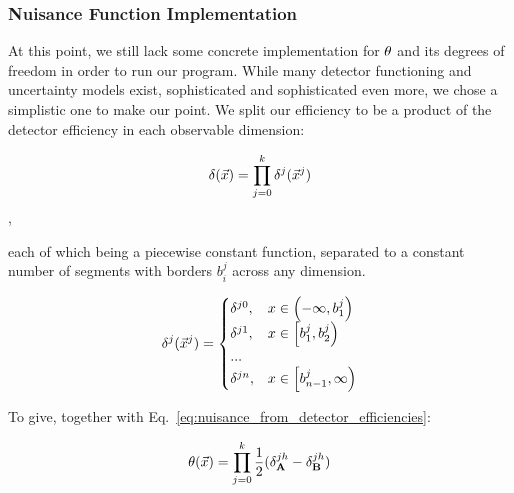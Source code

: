 \documentclass[../../ddppaper2.tex]{subfiles}
\begin{document}

\subsubsection{Nuisance Function Implementation}


At this point, we still lack some concrete implementation for ${\theta}$ and its degrees of freedom in order to run our program. While many detector functioning and uncertainty models exist, sophisticated and sophisticated even more, we chose a simplistic one to make our point. We split our efficiency to be a product of the detector efficiency in each observable dimension:

\begin{equation}
    \delta(\vec{{x}}) = \prod\limits_{j=0}^k \delta^j(\vec{{x}}^j)
\end{equation},

\noindent each of which being a piecewise constant function, separated to a constant number of segments with borders $b_i^j$ across any dimension.

\begin{equation}
    \delta^j(\vec{{x}}^j) = 
    \begin{cases}
        \delta^{j0}, &x \in \left(-\infty, b_1^j\right) \\
        \delta^{j1}, &x \in \left[b_1^j, b_2^j\right) \\
        ... \\
        \delta^{jn}, &x \in \left[b_{n-1}^j, \infty\right) \\
    \end{cases}
\end{equation}

To give, together with Eq.~\ref{eq:nuisance_from_detector_efficiencies}:

\begin{equation}
    {\theta}(\vec{{x}}) = \prod\limits_{j=0}^{k} \dfrac{1}{2}(\delta^{jh}_{\mathbf{A}} - \delta^{jh}_{\mathbf{B}})
\end{equation}
\end{document}
